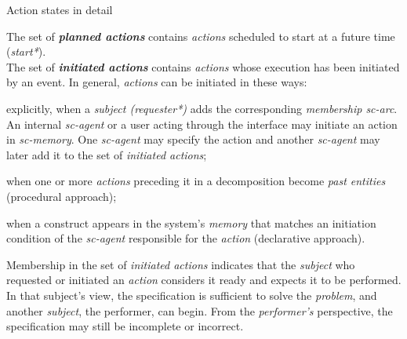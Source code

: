 \begin{frame}{Action states in detail}
\topline
\justifying
\vspace{10mm}

    The set of \textbf{\textit{planned actions}} contains \textit{actions} scheduled to start at a future time (\textit{start*}).\\
    The set of \textbf{\textit{initiated actions}} contains \textit{actions} whose execution has been initiated by an event.
    In general, \textit{actions} can be initiated in these ways:
    \begin{textitemize}
	   \item explicitly, when a \textit{subject (requester*)} adds the corresponding \textit{membership sc-arc}. An internal \textit{sc-agent} or a user acting through the interface may initiate an action in \textit{sc-memory}. One \textit{sc-agent} may specify the action and another \textit{sc-agent} may later add it to the set of \textit{initiated actions};
    \end{textitemize}
\end{frame}

\begin{frame}{}
\justifying
\vspace{10mm}

	\begin{textitemize}
	   \item when one or more \textit{actions} preceding it in a decomposition become \textit{past entities} (procedural approach);
	   \item when a construct appears in the system's \textit{memory} that matches an initiation condition of the \textit{sc-agent} responsible for the \textit{action} (declarative approach).
	\end{textitemize}

    Membership in the set of \textit{initiated actions} indicates that the \textit{subject} who requested or initiated an \textit{action} considers it ready and expects it to be performed. In that subject's view, the specification is sufficient to solve the \textit{problem}, and another \textit{subject}, the performer, can begin. From the \textit{performer's} perspective, the specification may still be incomplete or incorrect.\\
\end{frame}

